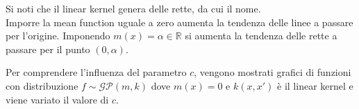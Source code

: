 Si noti che il linear kernel genera delle rette, da cui il nome.\\
Imporre la mean function uguale a zero aumenta la tendenza delle linee a passare per l'origine. Imponendo $m(x)=\alpha\in\mathbb{R}$ si aumenta la tendenza delle rette a passare per il punto $(0,\alpha)$. 



\newpage






\vspace{1cm}
Per comprendere l'influenza del parametro $c$, vengono mostrati grafici di funzioni con distribuzione $f\sim \mathcal{GP}(m,k)$ dove $m(x)=0$ e $k(x,x')$ è il linear kernel e viene variato il valore di $c$.

